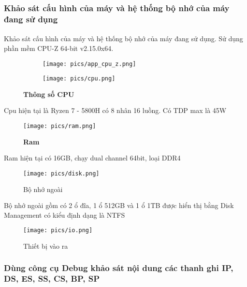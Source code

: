 \documentclass[12pt]{article}
\begin{document}
\subsubsection{Khảo sát cấu hình của máy và hệ thống bộ nhớ của máy đang sử dụng }

\paragraph{} 
Khảo sát cấu hình của máy và hệ thống bộ nhớ của máy đang sử dụng. Sử dụng phần mềm CPU-Z 64-bit v2.15.0x64.

\begin{figure}[H]
  \centering
  \begin{subfigure}[b]{0.3\linewidth}
    \texttt{[image: pics/app\_cpu\_z.png]}
  \end{subfigure}
  \begin{subfigure}[b]{0.3\linewidth}
    \texttt{[image: pics/cpu.png]}
  \end{subfigure}
  \caption{\textbf{Thông số CPU} }
  \label{fig:cpu}
\end{figure}
\begin{center}
  Cpu hiện tại là Ryzen 7 - 5800H có 8 nhân 16 luồng. Có TDP max là 45W
\end{center}
\begin{figure}[H]
  \centering
  \texttt{[image: pics/ram.png]}
  \caption{\textbf{Ram}}
  \label{fig:ram}
\end{figure}
\begin{center}
  Ram hiện tại có 16GB, chạy dual channel 64bit, loại DDR4
\end{center}
\begin{figure}[H]
  \centering
  \texttt{[image: pics/disk.png]}
  \caption{Bộ nhớ ngoài}
  \label{fig:disk}
\end{figure}
\begin{center}
Bộ nhớ ngoài gồm có 2 ổ đĩa, 1 ổ 512GB và 1 ổ 1TB được hiển thị bằng Disk Management có kiểu định dạng là NTFS
\end{center}
\begin{figure}[H]
  \centering
  \texttt{[image: pics/io.png]}
  \caption{Thiết bị vào ra}
  \label{fig:io}
\end{figure}

\subsubsection{Dùng công cụ Debug khảo sát nội dung các thanh ghi IP, DS, ES, SS, CS, BP, SP}
\end{document}
